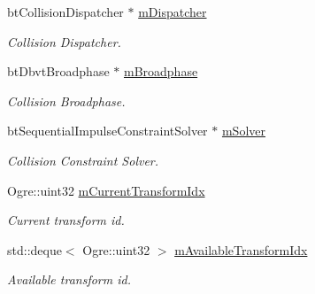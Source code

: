 \begin{DoxyCompactItemize}
\mbox{\label{class_common_1_1_logic_system_afab3b81f6dd1a32d91a4b2fbe5153fd9}} 
bt\+Collision\+Dispatcher $\ast$ \hyperlink{class_common_1_1_logic_system_afab3b81f6dd1a32d91a4b2fbe5153fd9}{m\+Dispatcher}
\begin{DoxyCompactList}\small\item\em Collision Dispatcher. \end{DoxyCompactList}\item 
\mbox{\label{class_common_1_1_logic_system_adf97b2bb9e373e9b81e8b52936c5e8d8}} 
bt\+Dbvt\+Broadphase $\ast$ \hyperlink{class_common_1_1_logic_system_adf97b2bb9e373e9b81e8b52936c5e8d8}{m\+Broadphase}
\begin{DoxyCompactList}\small\item\em Collision Broadphase. \end{DoxyCompactList}\item 
\mbox{\label{class_common_1_1_logic_system_ab9394f7c8ca427c4121e0445f8ae151d}} 
bt\+Sequential\+Impulse\+Constraint\+Solver $\ast$ \hyperlink{class_common_1_1_logic_system_ab9394f7c8ca427c4121e0445f8ae151d}{m\+Solver}
\begin{DoxyCompactList}\small\item\em Collision Constraint Solver. \end{DoxyCompactList}\item 
\mbox{\label{class_common_1_1_logic_system_a86139251209b2eba41382475544fc41b}} 
Ogre\+::uint32 \hyperlink{class_common_1_1_logic_system_a86139251209b2eba41382475544fc41b}{m\+Current\+Transform\+Idx}
\begin{DoxyCompactList}\small\item\em Current transform id. \end{DoxyCompactList}\item 
\mbox{\label{class_common_1_1_logic_system_ae196e1204c52d372075ffa8d15a7548a}} 
std\+::deque$<$ Ogre\+::uint32 $>$ \hyperlink{class_common_1_1_logic_system_ae196e1204c52d372075ffa8d15a7548a}{m\+Available\+Transform\+Idx}
\begin{DoxyCompactList}\small\item\em Available transform id. \end{DoxyCompactList}\end{DoxyCompactItemize}


